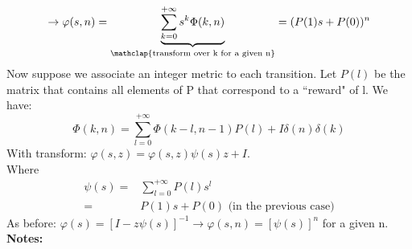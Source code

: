 $$\rightarrow \varphi(s,n)= \underbrace{\sum\limits_{k=0}^{+\infty} s^k \Phi(k,n)}_{\mathclap{\text{transform over k for a given n}}}=(P(1)s+P(0))^n$$
Now suppose we associate an integer metric to each transition. Let $P(l)$ be the matrix that contains all elements of P that correspond to a ``reward" of l. We have:
$$\Phi(k,n) = \sum\limits_{l=0}^{+\infty} \Phi(k-l,n-1)P(l) + I\delta(n)\delta(k)$$
With transform: $\varphi(s,z) = \varphi(s,z)\psi(s)z + I$.\\
Where
\begin{equation}
\begin{split}
		\psi(s) =& \sum\limits_{l=0}^{+\infty} P(l)s^l \\
						=& P(1)s + P(0) \text{  (in the previous case)}
\end{split}
\end{equation}
As before: $\varphi(s) = [I - z\psi(s)]^{-1} \rightarrow \varphi(s,n)=[\psi(s)]^n$ for a given n.\\
\textbf{Notes:}
